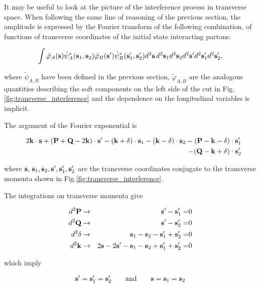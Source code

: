 \documentclass{ws-rv9x6}
\begin{document}
It may be useful to look at the picture of the interference process in transverse space. When following the same line of reasoning of the previous section, the amplitude is expressed by the Fourier transform of the following combination, of functions of transverse coordinates of the initial state interacting partons: 

\begin{eqnarray}
\int\tilde\varphi_A({\bf s})\tilde\psi^*_A({\bf s}_1, {\bf s}_2)\tilde\varphi_B({\bf s}')\tilde\psi^*_B({\bf s}_1', {\bf s}_2')d^2{\bf s}\,d^2{\bf s}_1d^2{\bf s}_2d^2{\bf s}'d^2{\bf s}_1'd^2{\bf s}_2',
\label{transv}
\end{eqnarray}

\noindent where $\tilde\psi_{A,B}$ have been defined in the previous section, $\tilde\varphi_{A,B}$ are the analogous quantities describing the soft components on the left side of the cut in Fig.\ref{fig:transverse_interference} and the dependence on the longitudinal variables is implicit. 

The argument of the Fourier exponential is   

\begin{eqnarray}
&&2{\bf k\cdot s}+({\bf P}+{\bf Q}-2\bf k)\cdot s'-(k+\delta)\cdot s_{\rm 1}-(k-\delta)\cdot s_{\rm 2}-(P-k-\delta)\cdot s_{\rm 1}'\nonumber\\
&&\bf-(Q-k+\delta)\cdot s_{\rm 2}'
\label{transv}
\end{eqnarray}

\noindent where $\bf s,\,s_{\rm 1}, s_{\rm 2}, s', s_{\rm 1}', s_{\rm 2}'$ are the transverse coordinates conjugate to the transverse momenta shown in Fig.\ref{fig:transverse_interference}. 

\noindent The integrations on transverse momenta give

\begin{eqnarray}
d^2\bf P&\to&{\bf s'-s_{\rm 1}'=}0\nonumber\\
d^2\bf Q&\to&{\bf s'-s_{\rm 2}'=}0\nonumber\\
d^2\bf\delta&\to&{\bf s_{\rm 1}-s_{\rm 2}-s_{\rm 1}'+s_{\rm 2}'=}0\nonumber\\
d^2\bf k&\to&{\bf {\rm 2}s-{\rm 2}s'-s_{\rm 1}-s_{\rm 2}+s_{\rm 1}'+s_{\rm 2}'=}0
\end{eqnarray}

\noindent which imply 

\begin{eqnarray}
\bf s'=s_{\rm 1}'=s_{\rm 2}'\qquad{\rm and}\qquad s=s_{\rm 1}=s_{\rm 2}
\nonumber
\end{eqnarray}
\end{document}
